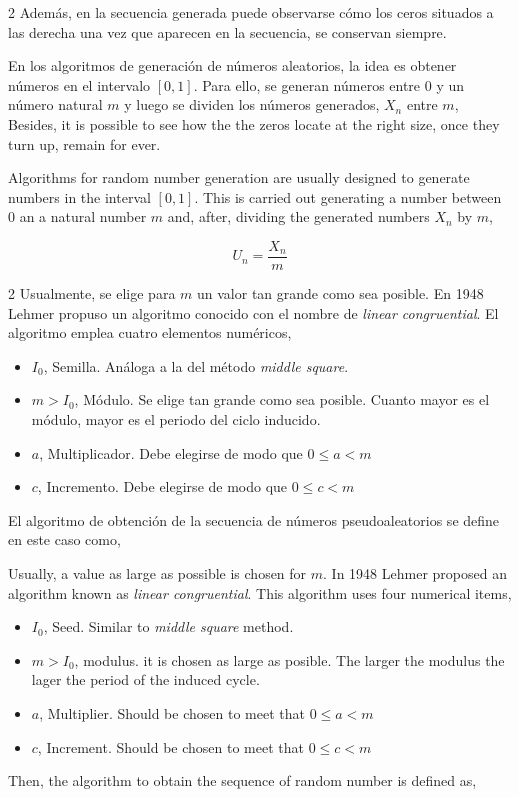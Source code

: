 \begin{paracol}{2}
Además, en la secuencia generada puede observarse cómo los ceros situados a las derecha una vez que aparecen en la secuencia, se conservan siempre.

En los algoritmos de generación de números aleatorios, la idea es obtener números en el intervalo $[0,1]$. Para ello, se generan números entre $0$ y un número natural $m$ y luego se dividen los números generados, $X_n$ entre $m$,
\switchcolumn
Besides, it is possible to see how the the zeros locate at the right size, once they turn up, remain for ever.

Algorithms for random number generation are usually designed to generate numbers in the interval $[0,1]$. This is carried out generating a number between $0$ an a natural number $m$ and, after, dividing the generated numbers $X_n$ by $m$,  
\end{paracol}

\begin{equation*}
U_n=\frac{X_n}{m}
\end{equation*}

\begin{paracol}{2}
Usualmente, se elige para $m$ un valor tan grande como sea posible. 
En 1948 Lehmer propuso un algoritmo conocido con el nombre de \emph{linear congruential}. El algoritmo emplea cuatro elementos numéricos,

\begin{itemize}
\item[-] $I_0$, Semilla. Análoga a la del método \emph{middle square}.
\item[-] $m > I_0$, Módulo.  Se elige tan grande como sea posible. Cuanto mayor es el módulo, mayor es el periodo del ciclo inducido.
\item[-] $a$, Multiplicador. Debe elegirse de modo que $0\le a < m$
\item[-] $c$, Incremento. Debe elegirse de modo que $0\le c < m$
\end{itemize}
 
El algoritmo de obtención de la secuencia de números pseudoaleatorios se define en este caso como,

\switchcolumn
Usually, a value as large as possible is chosen for $m$. In 1948 Lehmer proposed an algorithm known as \emph{linear congruential}. This algorithm uses four numerical items,

\begin{itemize}
	\item[-] $I_0$, Seed. Similar to \emph{middle square} method.
	\item[-] $m > I_0$, modulus.  it is chosen as large as posible. The larger the modulus the lager the period of the induced cycle.
	\item[-] $a$, Multiplier. Should be chosen to meet that $0\le a < m$
	\item[-] $c$, Increment. Should be chosen to meet that $0\le c < m$
\end{itemize}
 
 Then, the algorithm to obtain the sequence of random number is defined as,
\end{paracol}

